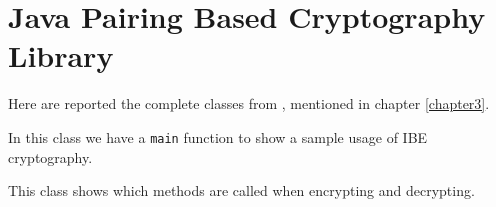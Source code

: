 \chapter{Java Pairing Based Cryptography Library}
\label{appendixB}
\thispagestyle{empty}

\noindent Here are reported the complete classes from \cite{ISCC:DecIov11}, mentioned in chapter \ref{chapter3}.

In this class we have a \texttt{main} function to show a sample usage of IBE cryptography.

	
This class shows which methods are called when encrypting and decrypting.


